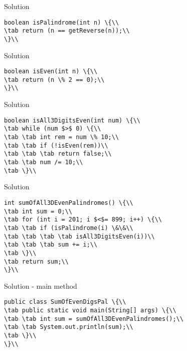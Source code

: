 \documentclass[aspectratio=169,14pt,usenames,dvipsnames]{beamer}
\newcommand\tab[1][1cm]{\hspace*{#1}}
\begin{document}
\begin{frame}{Solution}
\begin{lstlisting}
boolean isPalindrome(int n) \{\\
\tab return (n == getReverse(n));\\
\}\\
\end{lstlisting}
\end{frame}

\begin{frame}{Solution}

\begin{lstlisting}
boolean isEven(int n) \{\\
\tab return (n \% 2 == 0);\\
\}\\
\end{lstlisting}
\end{frame}

\begin{frame}{Solution}
\begin{lstlisting}
boolean isAll3DigitsEven(int num) \{\\
\tab while (num $>$ 0) \{\\
\tab \tab int rem = num \% 10;\\
\tab \tab if (!isEven(rem))\\
\tab \tab \tab return false;\\
\tab \tab num /= 10;\\
\tab \}\\
\end{lstlisting}
\end{frame}

\begin{frame}{Solution}
\begin{lstlisting}
int sumOfAll3DEvenPalindromes() \{\\
\tab int sum = 0;\\
\tab for (int i = 201; i $<$= 899; i++) \{\\
\tab \tab if (isPalindrome(i) \&\&\\
\tab \tab \tab \tab isAll3DigitsEven(i))\\
\tab \tab \tab sum += i;\\
\tab \}\\
\tab return sum;\\
\}\\
\end{lstlisting}
\end{frame}

\begin{frame}{Solution - main method}
\begin{lstlisting}
public class SumOfEvenDigsPal \{\\
\tab public static void main(String[] args) \{\\
\tab \tab int sum = sumOfAll3DEvenPalindromes();\\
\tab \tab System.out.println(sum);\\
\tab \}\\
\}\\
\end{lstlisting}
\end{frame}
\end{document}
